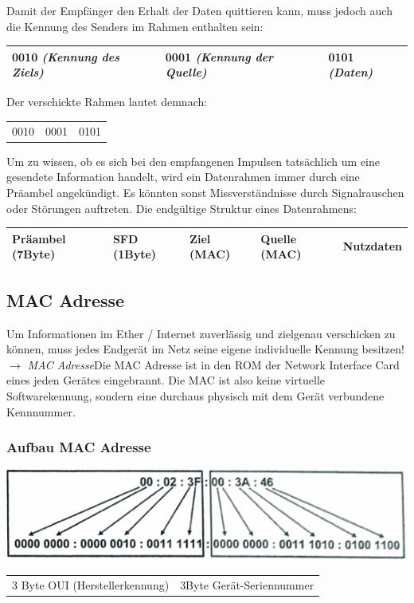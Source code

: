 \documentclass[12pt,a4paper]{article}
\begin{document}
    Damit der Empfänger den Erhalt der Daten quittieren kann, muss jedoch auch die Kennung des Senders im Rahmen enthalten sein:
	\begin{center}
		\begin{tabularx}{17cm}{|X|X|X|}
			\hline
			0010 \textit{(Kennung des Ziels)}&0001 \textit{(Kennung der Quelle)}&0101 \textit{(Daten)}\\
			\hline
		\end{tabularx}
	\end{center}
    Der verschickte Rahmen lautet demnach:
	\begin{center}
		\begin{tabularx}{5cm}{XXX}
			0010&0001&0101\\
		\end{tabularx}
	\end{center}
    Um zu wissen, ob es sich bei den empfangenen Impulsen tatsächlich um eine gesendete Information handelt, wird ein Datenrahmen immer durch eine Präambel angekündigt. Es könnten sonst Missverständnisse durch Signalrauschen oder Störungen auftreten. Die endgültige Struktur eines Datenrahmens:
	\begin{center}
		\begin{tabularx}{17cm}{|l|l|X|X|X|}
			\hline
			Präambel (7Byte)&SFD (1Byte)&Ziel (MAC)&Quelle (MAC)&Nutzdaten\\
			\hline
		\end{tabularx}
	\end{center}

\subsection{MAC Adresse}
    Um Informationen im Ether / Internet zuverlässig und zielgenau verschicken zu können, muss jedes Endgerät im Netz seine eigene individuelle Kennung besitzen!\newline $\longrightarrow$ \emph{MAC Adresse}\newline Die MAC Adresse ist in den ROM der Network Interface Card eines jeden Gerätes eingebrannt. Die MAC ist also keine virtuelle Softwarekennung, sondern eine durchaus physisch mit dem Gerät verbundene Kennnummer.

\subsubsection{Aufbau MAC Adresse}
    \begin{center}
        \includegraphics[scale=1]{Bilder/MAC.png}
        \begin{tabularx}{14cm}{XX}
            3 Byte OUI (Herstellerkennung)&3Byte Gerät-Seriennummer
        \end{tabularx}
    \end{center}
    
\end{document}
